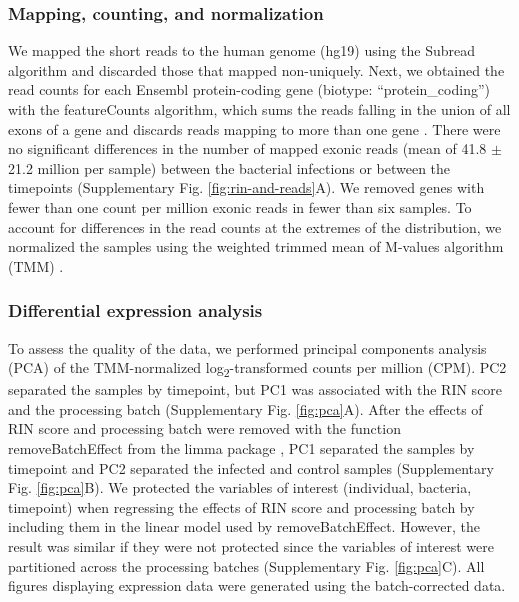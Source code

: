 \subsubsection{Mapping, counting, and
normalization}\label{mapping-counting-and-normalization}

We mapped the short reads to the human genome (hg19) using the Subread
algorithm \citep{Liao2013} and discarded those that mapped non-uniquely.
Next, we obtained the read counts for each Ensembl protein-coding gene
(biotype: ``protein\_coding'') with the featureCounts algorithm, which
sums the reads falling in the union of all exons of a gene and discards
reads mapping to more than one gene \citep{Liao2013a}. There were no
significant differences in the number of mapped exonic reads (mean of
41.8 $\pm$ 21.2 million per sample) between the bacterial infections or
between the timepoints (Supplementary Fig. \ref{fig:rin-and-reads}A). We removed genes with
fewer than one count per million exonic reads in fewer than six samples.
To account for differences in the read counts at the extremes of the
distribution, we normalized the samples using the weighted trimmed mean
of M-values algorithm (TMM) \citep{Robinson2010}.

\subsubsection{Differential expression
analysis}\label{differential-expression-analysis}

To assess the quality of the data, we performed principal components
analysis (PCA) of the TMM-normalized log\textsubscript{2}-transformed
counts per million (CPM). PC2 separated the samples by timepoint, but
PC1 was associated with the RIN score and the processing batch
(Supplementary Fig. \ref{fig:pca}A). After the effects of RIN score and
processing batch were removed with the function removeBatchEffect from
the limma package \citep{Ritchie2015}, PC1 separated the samples by
timepoint and PC2 separated the infected and control samples
(Supplementary Fig. \ref{fig:pca}B). We protected the variables of interest
(individual, bacteria, timepoint) when regressing the effects of RIN
score and processing batch by including them in the linear model used by
removeBatchEffect. However, the result was similar if they were not
protected since the variables of interest were partitioned across the
processing batches (Supplementary Fig. \ref{fig:pca}C). All figures displaying
expression data were generated using the batch-corrected data.


